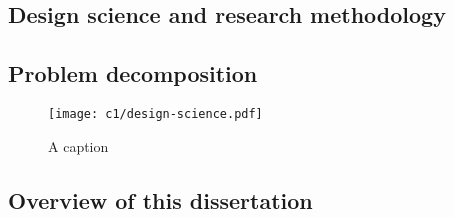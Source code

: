 \subsection{Design science and research methodology}

\subsection{Problem decomposition}
\begin{figure}
    \centering
    \texttt{[image: c1/design-science.pdf]}
    \caption{A caption}\label{fig:problem-decomposition}
\end{figure}
\subsection{Overview of this dissertation}

